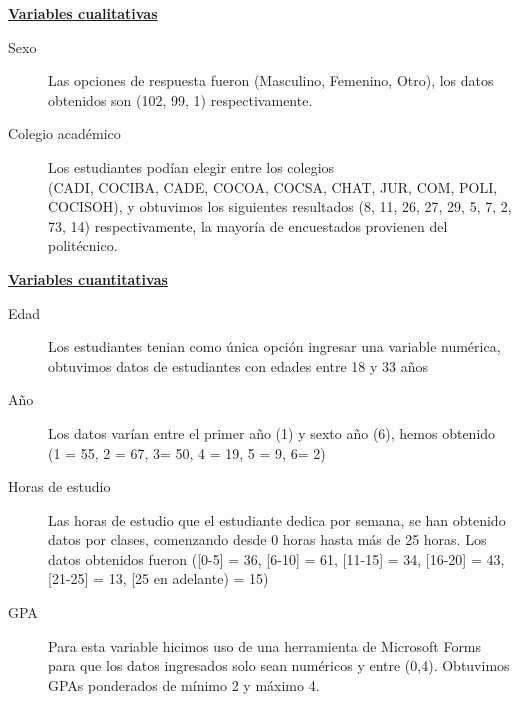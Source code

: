 \documentclass[25pt]{article}
\begin{document}
{\bfseries\underline {Variables cualitativas}}
\begin{description}
\item[Sexo]    Las opciones de respuesta fueron (Masculino, Femenino, Otro), los datos obtenidos son (102, 99, 1) respectivamente.
\item[Colegio académico] Los estudiantes podían elegir entre los colegios\\ (CADI, COCIBA, CADE, COCOA, COCSA, CHAT, JUR, COM, POLI, COCISOH), y obtuvimos los siguientes resultados (8, 11, 26, 27, 29, 5, 7, 2, 73, 14) respectivamente, la mayoría de encuestados provienen del politécnico.
\end{description}
\vspace{0.50cm}
{\bfseries\underline {Variables cuantitativas}}
\begin{description}
\item[Edad]    Los estudiantes tenian como única opción ingresar una variable numérica, obtuvimos datos de estudiantes con edades entre 18 y 33 años
\item[Año]  Los datos varían entre el primer año (1) y sexto año (6), hemos obtenido (1 = 55, 2 = 67, 3= 50, 4 = 19, 5 = 9, 6= 2)
\item[Horas de estudio]  Las horas de estudio que el estudiante dedica por semana, se han obtenido datos por clases, comenzando desde 0 horas hasta más de 25 horas. Los datos obtenidos fueron ([0-5] = 36, [6-10] = 61, [11-15] = 34, [16-20] = 43, [21-25] = 13, [25 en adelante) = 15)
\item[GPA]  Para esta variable hicimos uso de una herramienta de Microsoft Forms para que los datos ingresados solo sean numéricos y entre (0,4). Obtuvimos GPAs ponderados de mínimo 2 y máximo 4. 
\end{description}
\end{document}
